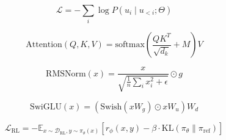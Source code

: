 
\begin{equation}
\mathcal{L} = -\sum_{i} \log P(u_i \mid u_{<i}; \Theta)
\end{equation}

\begin{equation}
\text{Attention}(Q, K, V) = \text{softmax}\left( \frac{QK^T}{\sqrt{d_k}} + M \right) V
\end{equation}

\begin{equation}
\text{RMSNorm}(x) = \frac{x}{\sqrt{\frac{1}{n} \sum_i x_i^2 + \epsilon}} \odot g
\end{equation}

\begin{equation}
\text{SwiGLU}(x) = \left(\text{Swish}(xW_g) \odot xW_u\right)W_d
\end{equation}

\begin{equation}
\mathcal{L}_{\text{RL}} = -\mathbb{E}_{x \sim \mathcal{D}_{\text{RL}}, y \sim \pi_{\theta}(x)}
\left[ r_{\phi}(x, y) - \beta \cdot \text{KL}\left( \pi_{\theta} \parallel \pi_{\text{ref}} \right) \right]
\end{equation}